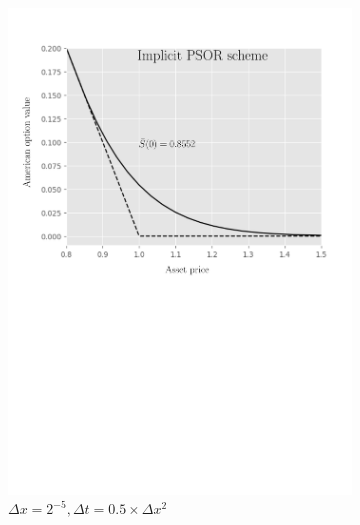\begin{figure}[H]
\begin{subfigure}{0.4\textwidth}
    \includegraphics[width=\textwidth]{chapters/chapter5/TestCase2ImplicitLCP.pdf}
    \caption{$\Delta{x}=2^{-5}, \Delta{t}=0.5\times\Delta{x}^2$}
    \label{fig:lcp:numericaresults:test_case_2_implicit}
  \end{subfigure}
  \hspace{0.5cm}
  \begin{subfigure}{0.4\textwidth}
    \label{fig:lcp:numericaresults:test_case_2_crank_nicholson}
    \centering

\end{subfigure}
\end{figure}
